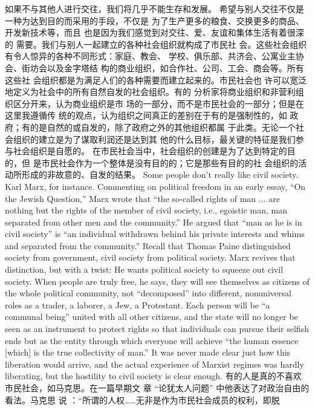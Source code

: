 \begin{paracol}{2}
\switchcolumn
如果不与其他人进行交往，我们将几乎不能生存和发展。
希望与别人交往不仅是一种为达到目的而采用的手段，不仅是
为了生产更多的粮食、交换更多的商品、开发新技术等，而且
也是因为我们感觉到对交往、爱、友谊和集体生活有着很深的
需要。我们与别人一起建立的各种社会组织就构成了市民社
会。这些社会组织有令人惊异的各种不同形式：家庭、教会、
学校、俱乐部、共济会、公寓业主协会、街坊会以及金字塔结
构的商业组织，如合作社、公司、工会、商会等。所有这些社
会组织都是为满足人们的各种需要而建立起来的。市民社会也
许可以宽泛地定义为社会中的所有自然自发的社会组织。有的
分析家将商业组织和非营利组织区分开来，认为商业组织是市
场的一部分，而不是市民社会的一部分；但是在这里我遵循传
统的观点，认为组织之间真正的差别在于有的是强制性的，如
政府；有的是自然的或自发的，除了政府之外的其他组织都属
于此类。无论一个社会组织的建立是为了谋取利润还是达到其
他的什么目标，最关键的特征是我们参与社会组织是自愿的。
在市民社会当中，社会组织的创建是为了达到特定的目的，但
是市民社会作为一个整体是没有目的的；它是那些有目的的社
会组织的活动所形成的非故意的、自发的结果。
\switchcolumn*
Some people don't really like civil society. Karl Marx, for instance. Commenting on political freedom in an early essay, ``On
the Jewish Question,'' Marx wrote that ``the so-called rights of
man $\ldots$ are nothing but the rights of the member of civil society, i.e., egoistic man, man separated from other men and the
community.'' He argued that ``man as he is in civil society'' is ``an
individual withdrawn behind his private interests and whims
and separated from the community.'' Recall that Thomas Paine
distinguished society from government, civil society from political society. Marx revives that distinction, but with a twist: He
wants political society to squeeze out civil society. When people
are truly free, he says, they will see themselves as citizens of the
whole political community, not ``decomposed'' into different,
nonuniversal roles as a trader, a laborer, a Jew, a Protestant. Each
person will be ``a communal being'' united with all other citizens, and the state will no longer be seen as an instrument to
protect rights so that individuals can pursue their selfish ends
but as the entity through which everyone will achieve ``the
human essence [which] is the true collectivity of man.'' It was
never made clear just how this liberation would arrive, and the
actual experience of Marxist regimes was hardly liberating, but
the hostility to civil society is clear enough.
\switchcolumn
有的人是真的不喜欢市民社会，如马克思。在一篇早期文
章 “论犹太人问题” 中他表达了对政治自由的看法。马克思
说 ：“所谓的人权……无非是作为市民社会成员的权利，即脱

\end{paracol}
